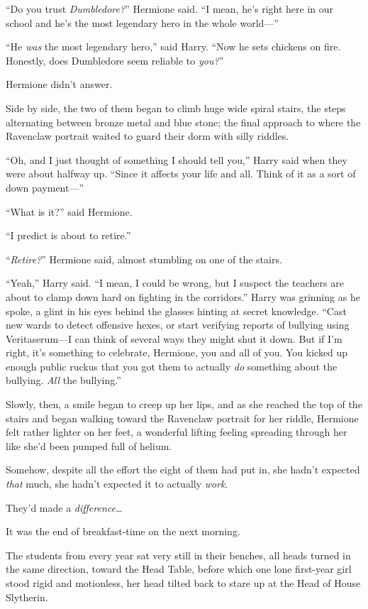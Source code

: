 “Do you trust \emph{Dumbledore?}” Hermione said. “I mean, he’s right here in our school and he’s the most legendary hero in the whole world—”

“He \emph{was} the most legendary hero,” said Harry. “Now he sets chickens on fire. Honestly, does Dumbledore seem reliable to \emph{you?}”

Hermione didn’t answer.

Side by side, the two of them began to climb huge wide spiral stairs, the steps alternating between bronze metal and blue stone; the final approach to where the Ravenclaw portrait waited to guard their dorm with silly riddles.

“Oh, and I just thought of something I should tell you,” Harry said when they were about halfway up. “Since it affects your life and all. Think of it as a sort of down payment—”

“What is it?” said Hermione.

“I predict \SPHEW is about to retire.”

“\emph{Retire?}” Hermione said, almost stumbling on one of the stairs.

“Yeah,” Harry said. “I mean, I could be wrong, but I suspect the teachers are about to clamp down hard on fighting in the corridors.” Harry was grinning as he spoke, a glint in his eyes behind the glasses hinting at secret knowledge. “Cast new wards to detect offensive hexes, or start verifying reports of bullying using Veritaserum—I can think of several ways they might shut it down. But if I’m right, it’s something to celebrate, Hermione, you and all of you. You kicked up enough public ruckus that you got them to actually \emph{do} something about the bullying. \emph{All} the bullying.”

Slowly, then, a smile began to creep up her lips, and as she reached the top of the stairs and began walking toward the Ravenclaw portrait for her riddle, Hermione felt rather lighter on her feet, a wonderful lifting feeling spreading through her like she’d been pumped full of helium.

Somehow, despite all the effort the eight of them had put in, she hadn’t expected \emph{that} much, she hadn’t expected it to actually \emph{work}.

They’d made a \emph{difference…}

\later

It was the end of breakfast-time on the next morning.

The students from every year sat very still in their benches, all heads turned in the same direction, toward the Head Table, before which one lone first-year girl stood rigid and motionless, her head tilted back to stare up at the Head of House Slytherin.

